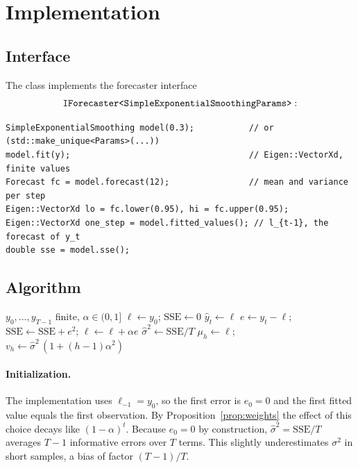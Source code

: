\documentclass[11pt,a4paper]{article}
\begin{document}
\section{Implementation}

\subsection{Interface}
The class implements the forecaster interface
\[
  \texttt{IForecaster<SimpleExponentialSmoothingParams>}:
\]
\begin{lstlisting}
SimpleExponentialSmoothing model(0.3);           // or (std::make_unique<Params>(...))
model.fit(y);                                    // Eigen::VectorXd, finite values
Forecast fc = model.forecast(12);                // mean and variance per step
Eigen::VectorXd lo = fc.lower(0.95), hi = fc.upper(0.95);
Eigen::VectorXd one_step = model.fitted_values(); // l_{t-1}, the forecast of y_t
double sse = model.sse();
\end{lstlisting}

\subsection{Algorithm}
\begin{algorithm}[ht]
\caption{SES fit and forecast}\label{alg:ses}
\begin{algorithmic}[1]
\Require $y_0,\dots,y_{T-1}$ finite, $\alpha\in(0,1]$
\State $\ell\gets y_0$;\; $\mathrm{SSE}\gets0$ 
  \State $\hat y_t\gets\ell$ 
  \State $e\gets y_t-\ell$;\; $\mathrm{SSE}\gets\mathrm{SSE}+e^2$;\; $\ell\gets\ell+\alpha e$
\EndFor
\State $\hat\sigma^2\gets\mathrm{SSE}/T$
 
  \State $\mu_h\gets\ell$;\; $v_h\gets\hat\sigma^2\,(1+(h-1)\alpha^2)$
\EndFor
\end{algorithmic}
\end{algorithm}

\paragraph{Initialization.}
The implementation uses $\ell_{-1}=y_0$, so the first error is $e_0=0$ and the
first fitted value equals the first observation. By
Proposition~\ref{prop:weights} the effect of this choice decays like
$(1-\alpha)^{t}$. Because $e_0=0$ by construction, $\hat\sigma^2=\mathrm{SSE}/T$
averages $T-1$ informative errors over $T$ terms. This slightly
underestimates $\sigma^2$ in short samples, a bias of factor $(T-1)/T$.
\end{document}
